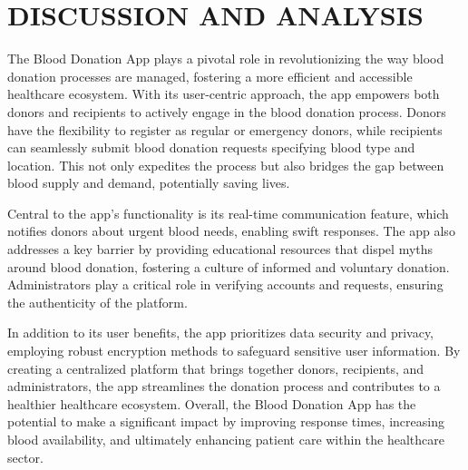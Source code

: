 \chapter{DISCUSSION AND ANALYSIS}






The Blood Donation App plays a pivotal role in revolutionizing the way blood donation processes are managed, fostering a more efficient and accessible healthcare ecosystem. With its user-centric approach, the app empowers both donors and recipients to actively engage in the blood donation process. Donors have the flexibility to register as regular or emergency donors, while recipients can seamlessly submit blood donation requests specifying blood type and location. This not only expedites the process but also bridges the gap between blood supply and demand, potentially saving lives.

Central to the app's functionality is its real-time communication feature, which notifies donors about urgent blood needs, enabling swift responses. The app also addresses a key barrier by providing educational resources that dispel myths around blood donation, fostering a culture of informed and voluntary donation. Administrators play a critical role in verifying accounts and requests, ensuring the authenticity of the platform.

In addition to its user benefits, the app prioritizes data security and privacy, employing robust encryption methods to safeguard sensitive user information. By creating a centralized platform that brings together donors, recipients, and administrators, the app streamlines the donation process and contributes to a healthier healthcare ecosystem. Overall, the Blood Donation App has the potential to make a significant impact by improving response times, increasing blood availability, and ultimately enhancing patient care within the healthcare sector.




